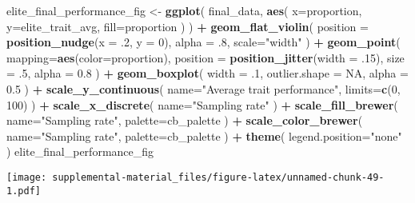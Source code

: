 \documentclass[]{book}
\newenvironment{Shaded}{\begin{snugshade}}{\end{snugshade}}
\newcommand{\DataTypeTok}[1]{\textcolor[rgb]{0.13,0.29,0.53}{#1}}
\newcommand{\DecValTok}[1]{\textcolor[rgb]{0.00,0.00,0.81}{#1}}
\newcommand{\FloatTok}[1]{\textcolor[rgb]{0.00,0.00,0.81}{#1}}
\newcommand{\KeywordTok}[1]{\textcolor[rgb]{0.13,0.29,0.53}{\textbf{#1}}}
\newcommand{\NormalTok}[1]{#1}
\newcommand{\OperatorTok}[1]{\textcolor[rgb]{0.81,0.36,0.00}{\textbf{#1}}}
\newcommand{\OtherTok}[1]{\textcolor[rgb]{0.56,0.35,0.01}{#1}}
\newcommand{\StringTok}[1]{\textcolor[rgb]{0.31,0.60,0.02}{#1}}
\begin{document}
\begin{Shaded}
\begin{Highlighting}[]
\NormalTok{elite_final_performance_fig <-}\StringTok{ }\KeywordTok{ggplot}\NormalTok{(}
\NormalTok{    final_data,}
    \KeywordTok{aes}\NormalTok{(}
      \DataTypeTok{x=}\NormalTok{proportion,}
      \DataTypeTok{y=}\NormalTok{elite_trait_avg,}
      \DataTypeTok{fill=}\NormalTok{proportion}
\NormalTok{    )}
\NormalTok{  ) }\OperatorTok{+}
\StringTok{  }\KeywordTok{geom_flat_violin}\NormalTok{(}
    \DataTypeTok{position =} \KeywordTok{position_nudge}\NormalTok{(}\DataTypeTok{x =} \FloatTok{.2}\NormalTok{, }\DataTypeTok{y =} \DecValTok{0}\NormalTok{),}
    \DataTypeTok{alpha =} \FloatTok{.8}\NormalTok{,}
    \DataTypeTok{scale=}\StringTok{"width"}
\NormalTok{  ) }\OperatorTok{+}
\StringTok{  }\KeywordTok{geom_point}\NormalTok{(}
    \DataTypeTok{mapping=}\KeywordTok{aes}\NormalTok{(}\DataTypeTok{color=}\NormalTok{proportion),}
    \DataTypeTok{position =} \KeywordTok{position_jitter}\NormalTok{(}\DataTypeTok{width =} \FloatTok{.15}\NormalTok{),}
    \DataTypeTok{size =} \FloatTok{.5}\NormalTok{,}
    \DataTypeTok{alpha =} \FloatTok{0.8}
\NormalTok{  ) }\OperatorTok{+}
\StringTok{  }\KeywordTok{geom_boxplot}\NormalTok{(}
    \DataTypeTok{width =} \FloatTok{.1}\NormalTok{,}
    \DataTypeTok{outlier.shape =} \OtherTok{NA}\NormalTok{,}
    \DataTypeTok{alpha =} \FloatTok{0.5}
\NormalTok{  ) }\OperatorTok{+}
\StringTok{  }\KeywordTok{scale_y_continuous}\NormalTok{(}
    \DataTypeTok{name=}\StringTok{"Average trait performance"}\NormalTok{,}
    \DataTypeTok{limits=}\KeywordTok{c}\NormalTok{(}\DecValTok{0}\NormalTok{, }\DecValTok{100}\NormalTok{)}
\NormalTok{  ) }\OperatorTok{+}
\StringTok{  }\KeywordTok{scale_x_discrete}\NormalTok{(}
    \DataTypeTok{name=}\StringTok{"Sampling rate"}
\NormalTok{  ) }\OperatorTok{+}
\StringTok{  }\KeywordTok{scale_fill_brewer}\NormalTok{(}
    \DataTypeTok{name=}\StringTok{"Sampling rate"}\NormalTok{,}
    \DataTypeTok{palette=}\NormalTok{cb_palette}
\NormalTok{  ) }\OperatorTok{+}
\StringTok{  }\KeywordTok{scale_color_brewer}\NormalTok{(}
    \DataTypeTok{name=}\StringTok{"Sampling rate"}\NormalTok{,}
    \DataTypeTok{palette=}\NormalTok{cb_palette}
\NormalTok{  ) }\OperatorTok{+}
\StringTok{  }\KeywordTok{theme}\NormalTok{(}
    \DataTypeTok{legend.position=}\StringTok{"none"}
\NormalTok{  )}
\NormalTok{elite_final_performance_fig}
\end{Highlighting}
\end{Shaded}

\texttt{[image: supplemental-material\_files/figure-latex/unnamed-chunk-49-1.pdf]}
\end{document}
